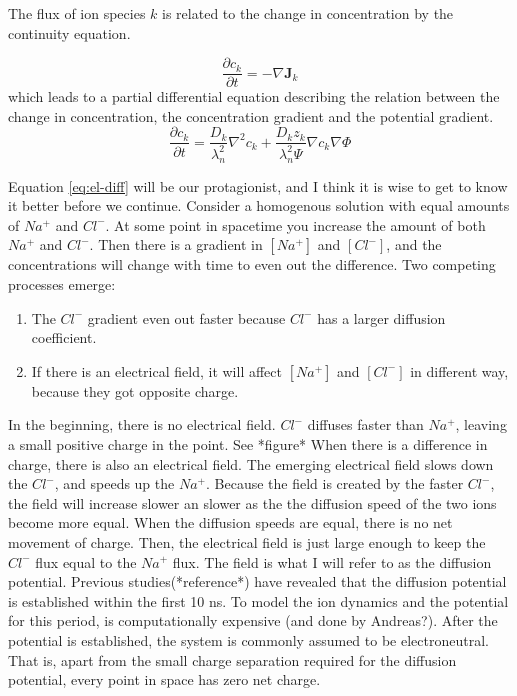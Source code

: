 \documentclass{article}
\begin{document}
The flux  of ion species $k$ is related to the change in concentration by the continuity equation. 

\begin{equation}
\frac{\partial c_k}{\partial t} = -\nabla \bm{J}_k
\end{equation}
which leads to a partial differential equation describing the relation between the change in concentration, the concentration gradient and the potential gradient.
 \begin{equation}\label{eq:el-diff}
\frac{\partial c_k}{\partial t}  = \frac{D_k}{\lambda_n^2}\nabla^2 c_k +\frac{D_k z_k}{\lambda_n^2 \Psi}\nabla c_k  \nabla \Phi
\end{equation}

Equation \ref{eq:el-diff} will be our protagionist, and I think it is wise to get to know it better before we continue. Consider a homogenous solution with equal amounts of $Na^+$ and $Cl^-$. At some point in spacetime you increase the amount of both $Na^+$ and $Cl^-$. Then there is a gradient in $[Na^+]$ and $[Cl^-]$, and the concentrations will change with time to even out the difference. Two competing processes emerge:
\begin{enumerate}
\item The $Cl^-$ gradient even out faster because $Cl^-$ has a larger diffusion coefficient. 
\item If there is an electrical field, it will affect  $[Na^+]$ and $[Cl^-]$ in different way, because they got opposite charge.
\end{enumerate}

In the beginning, there is no electrical field. $Cl^-$ diffuses faster than $Na^+$, leaving a small positive charge in the point. See *figure* When there is a difference in charge, there is also an electrical field. The emerging electrical field slows down the $Cl^-$, and speeds up the $Na^+$. Because the field is created by the faster $Cl^-$, the field will increase slower an slower as the  the diffusion speed of the two ions become more equal. When the diffusion speeds are equal, there is no net movement of charge. Then, the electrical field is just large enough to keep the $Cl^-$ flux equal to the $Na^+$ flux. The field is what I will refer to as the diffusion potential. Previous studies(*reference*) have revealed that the diffusion potential is established within the first 10 ns. To model the ion dynamics and the potential for this period, is computationally expensive (and done by Andreas?). After the potential is established, the system is commonly assumed to be electroneutral. That is, apart from the small charge separation required for the diffusion potential, every point in space has zero net charge. 
\end{document}
